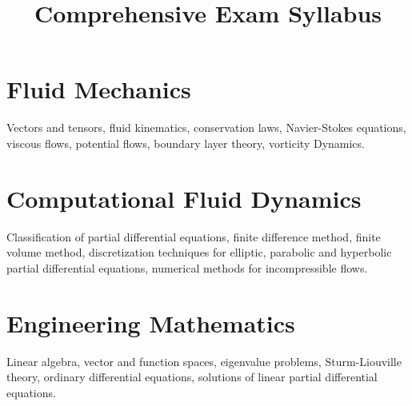 \documentclass{article}
\title{Comprehensive Exam Syllabus}
\date{}
\begin{document}
	\maketitle
	\section{Fluid Mechanics}
	Vectors and tensors, fluid kinematics, conservation laws, Navier-Stokes equations, viscous flows, potential flows, boundary layer theory, vorticity Dynamics.  
	
	\section{Computational Fluid Dynamics}
	Classification of partial differential equations, finite difference method, finite volume method, discretization techniques for elliptic, parabolic and hyperbolic partial differential equations, numerical methods for incompressible flows.
	
	\section{Engineering Mathematics} 
	Linear algebra, vector and function spaces, eigenvalue problems, Sturm-Liouville theory, ordinary differential equations, solutions of linear partial differential equations.
	
\end{document}
